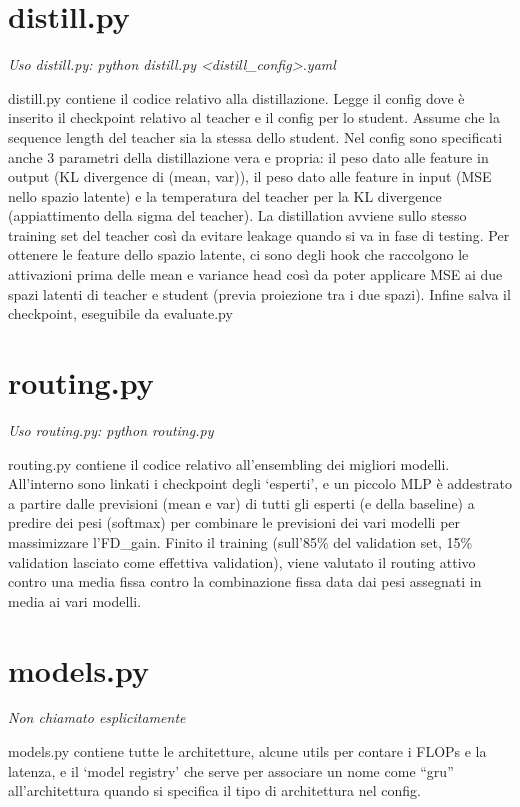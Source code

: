 \documentclass[11pt]{article}
\newcommand{\nota}[1]{{\itshape\color{gray!60!black} #1}\par}
\begin{document}
\section{distill.py}

\nota{Uso distill.py: python distill.py <distill\_config>.yaml}

distill.py contiene il codice relativo alla distillazione. Legge il config dove è inserito il checkpoint relativo al teacher e il config per lo student. Assume che la sequence length del teacher sia la stessa dello student. Nel config sono specificati anche 3 parametri della distillazione vera e propria: il peso dato alle feature in output (KL divergence di (mean, var)), il peso dato alle feature in input (MSE nello spazio latente) e la temperatura del teacher per la KL divergence (appiattimento della sigma del teacher). La distillation avviene sullo stesso training set del teacher così da evitare leakage quando si va in fase di testing. Per ottenere le feature dello spazio latente, ci sono degli hook che raccolgono le attivazioni prima delle mean e variance head così da poter applicare MSE ai due spazi latenti di teacher e student (previa proiezione tra i due spazi). Infine salva il checkpoint, eseguibile da evaluate.py

\section{routing.py}

\nota{Uso routing.py: python routing.py}

routing.py contiene il codice relativo all'ensembling dei migliori modelli. All'interno sono linkati i checkpoint degli `esperti', e un piccolo MLP è addestrato a partire dalle previsioni (mean e var) di tutti gli esperti (e della baseline) a predire dei pesi (softmax) per combinare le previsioni dei vari modelli per massimizzare l'FD\_gain. Finito il training (sull'85\% del validation set, 15\% validation lasciato come effettiva validation), viene valutato il routing attivo contro una media fissa contro la combinazione fissa data dai pesi assegnati in media ai vari modelli.

\section{models.py}

\nota{Non chiamato esplicitamente}

models.py contiene tutte le architetture, alcune utils per contare i FLOPs e la latenza, e il `model registry' che serve per associare un nome come ``gru'' all'architettura quando si specifica il tipo di architettura nel config.
\end{document}
